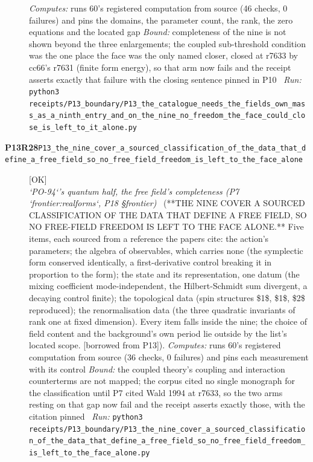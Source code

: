 \begin{description}
\emph{Computes:} runs 60's registered computation from source (46 checks, 0 failures) and pins the domains, the parameter count, the rank, the zero equations and the located gap
 \emph{Bound:} completeness of the nine is not shown beyond the three enlargements; the coupled sub-threshold condition was the one place the face was the only named closer, closed at r7633 by cc66's r7631 (finite form energy), so that arm now fails and the receipt asserts exactly that failure with the closing sentence pinned in P10
\ \emph{Run:} \texttt{python3 receipts/P13\_boundary/P13\_the\_catalogue\_needs\_the\_fields\_own\_mass\_as\_a\_ninth\_entry\_and\_on\_the\_nine\_no\_freedom\_the\_face\_could\_close\_is\_left\_to\_it\_alone.py}
\item[\rcptlabel{P13_the_nine_cover_a_sourced_classification_of_the_data_that_define_a_free_field_so_no_free_field_freedom_is_left_to_the_face_alone}{P13R28}\textbf{P13R28}\quad\texttt{P13\_the\_nine\_cover\_a\_sourced\_classification\_of\_the\_data\_that\_define\_a\_free\_field\_so\_no\_free\_field\_freedom\_is\_left\_to\_the\_face\_alone}]\hfill\textsf{[OK]}\\
\textit{`PO-94`'s quantum half, the free field's completeness (P7 `frontier:realforms`, P18 \S{}frontier)} \ (**THE NINE COVER A SOURCED CLASSIFICATION OF THE DATA THAT DEFINE A FREE FIELD, SO NO FREE-FIELD FREEDOM IS LEFT TO THE FACE ALONE.** Five items, each sourced from a reference the papers cite: the action's parameters; the algebra of observables, which carries none (the symplectic form conserved identically, a first-derivative control breaking it in proportion to the form); the state and its representation, one datum (the mixing coefficient mode-independent, the Hilbert-Schmidt sum divergent, a decaying control finite); the topological data (spin structures \$1\$, \$1\$, \$2\$ reproduced); the renormalisation data (the three quadratic invariants of rank one at fixed dimension). Every item falls inside the nine; the choice of field content and the background's own period lie outside by the list's located scope. [borrowed from P13]). 
\emph{Computes:} runs 60's registered computation from source (36 checks, 0 failures) and pins each measurement with its control
 \emph{Bound:} the coupled theory's coupling and interaction counterterms are not mapped; the corpus cited no single monograph for the classification until P7 cited Wald 1994 at r7633, so the two arms resting on that gap now fail and the receipt asserts exactly those, with the citation pinned
\ \emph{Run:} \texttt{python3 receipts/P13\_boundary/P13\_the\_nine\_cover\_a\_sourced\_classification\_of\_the\_data\_that\_define\_a\_free\_field\_so\_no\_free\_field\_freedom\_is\_left\_to\_the\_face\_alone.py}

\end{description}

